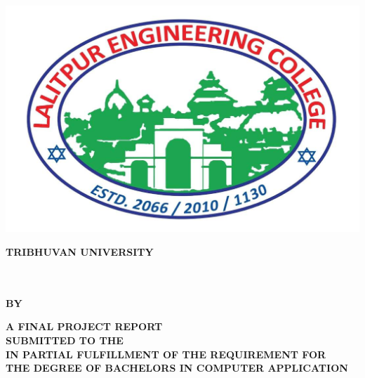\thispagestyle{empty}
\begin{center}
\begin{spacing}{1.6}

\includegraphics[scale=0.18]{img/Graphics/lec.jpg}

\textbf{
\large{TRIBHUVAN UNIVERSITY}\\
\MakeUppercase{\large{\theinstitute}}\\
\MakeUppercase{\large{\thecampus}}}

\vspace{0.5cm}

\hspace{-8cm}

\vspace{0.5cm}

\textbf{\MakeUppercase{\thetitle}\\
\vspace{0.5cm} 
BY \\ 
\MakeUppercase{\theauthor}}

\vspace{0.5cm}

\textbf{A FINAL PROJECT REPORT\\
SUBMITTED TO THE \MakeUppercase{\thedepartment}\\ IN PARTIAL FULFILLMENT OF THE REQUIREMENT FOR\\ THE DEGREE OF BACHELORS IN COMPUTER APPLICATION}
\bigskip

\par
\textbf{\MakeUppercase{\thedepartment}}\\
\textbf{\MakeUppercase{\thedepartmentAddress}}
\vspace{1cm}

\textbf{\MakeUppercase{\thedate}}


\end{spacing}
\end{center}

\clearpage